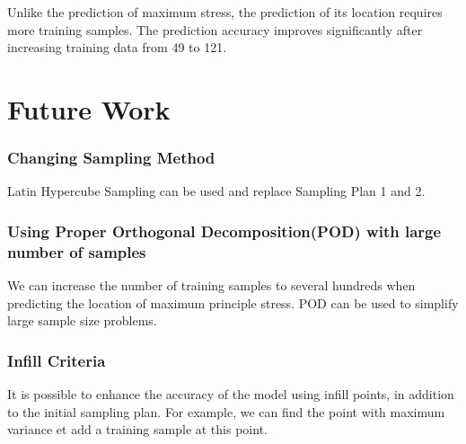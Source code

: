 \documentclass[conference]{IEEEtran}
\begin{document}
Unlike the prediction of maximum stress, the prediction of its location requires more training samples. The prediction accuracy improves significantly after increasing training data from 49 to 121. 

\section{Future Work}

\subsubsection{Changing Sampling Method}
Latin Hypercube Sampling can be used and replace Sampling Plan 1 and 2.

\subsubsection{Using Proper Orthogonal Decomposition(POD) with large number of samples}
We can increase the number of training samples to several hundreds when predicting the location of maximum principle stress. POD can be used to simplify large sample size problems.

\subsubsection{Infill Criteria}
It is possible to enhance the accuracy of the model using infill points, in addition to the initial sampling plan. For example, we can find the point with maximum variance et add a training sample at this point.
 








\end{document}
